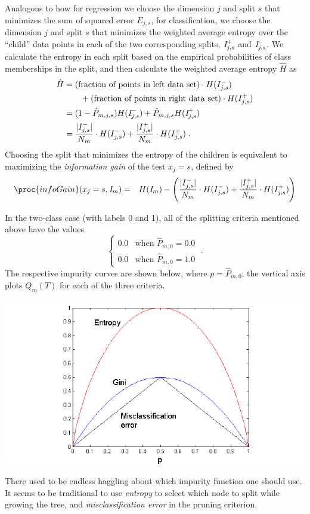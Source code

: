 Analogous to how for regression we choose the dimension $j$ and split
$s$ that minimizes the sum of squared error $E_{j,s}$, for
classification, we choose the dimension $j$ and split $s$ that
minimizes the weighted average entropy over the ``child'' data points
in each of the two corresponding splits,
${\emph I}^+_{j,s}$ and ${\emph I}^-_{j,s}$.
We calculate the entropy in each split based on the
empirical probabilities of class memberships in the split, and then
calculate the weighted average entropy $\hat{H}$ as
\begin{align}
  \hat{H} & = \text{(fraction of points in left data set)} \cdot H(I_{j,s}^-) \nonumber                     \\
          & \qquad + \text{(fraction of points in right data set)} \cdot H(I_{j,s}^+) \nonumber             \\
          & = (1-\hat{P}_{m,j,s}) H({\emph I}_{j,s}^{-}) + \hat{P}_{m,j,s} H({\emph I}_{j,s}^{+}) \nonumber \\
          & = \frac{|I^-_{j,s}|}{N_m} \cdot H(I_{j,s}^-) + \frac{|I^+_{j,s}|}{N_m} \cdot H(I_{j,s}^+)\; .
\end{align}
Choosing the split that minimizes the entropy of the children is
equivalent to maximizing the {\em information gain} of the test $x_j = s$, defined by
\begin{eqnarray}
  \proc{infoGain}(x_j = s, {\emph I}_m) & = & H({\emph I}_m) -
  \left(\frac{|I^-_{j,s}|}{N_m} \cdot H(I_{j,s}^-) + \frac{|I^+_{j,s}|}{N_m} \cdot H(I_{j,s}^+)\right)
\end{eqnarray}

In the two-class case (with labels 0 and 1), all of the splitting criteria mentioned
above have the values
\[
  \begin{cases}
    0.0 & \text{when $\hat{P}_{m,0} = 0.0$} \\
    0.0 & \text{when $\hat{P}_{m,0} = 1.0$}
  \end{cases} \; .
\]
The respective impurity curves are shown below, where $p =
  \hat{P}_{m,0}$; the vertical axis plots $Q_m(T)$ for each of the three
criteria.
\begin{center}
  \includegraphics[scale=0.5]{figures/impurity.png}
\end{center}
There used to be endless haggling about which impurity function one should
use.  It seems to be traditional to use {\em entropy} to select which
node to split while growing the tree, and {\em misclassification error}
in the pruning criterion.



